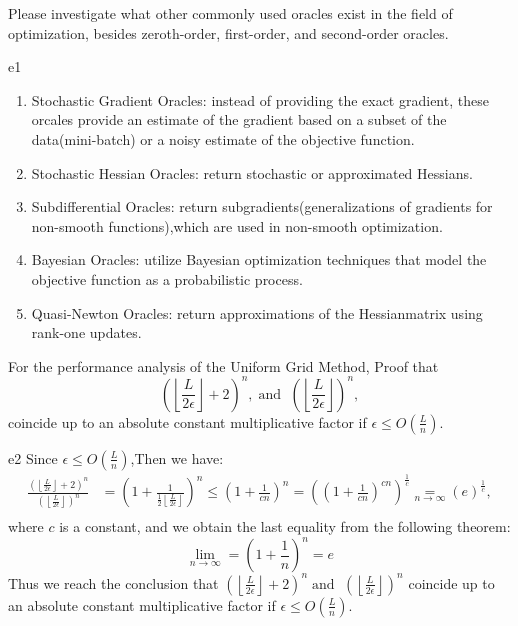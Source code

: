 \documentclass{article}
\begin{document}
\begin{excercise}\label{e1}
Please investigate what other commonly used oracles exist in the field of optimization, besides zeroth-order, first-order, and second-order oracles.
\end{excercise}
\begin{SOLUTION}{e1}
\begin{enumerate}
	\item Stochastic Gradient Oracles: instead of providing the exact gradient, these orcales provide an estimate of the gradient based on a subset of the data(mini-batch) or a noisy estimate of the objective function.
	\item Stochastic Hessian Oracles: return stochastic or approximated Hessians.
	\item Subdifferential Oracles: return subgradients(generalizations of gradients for non-smooth functions),which are used in non-smooth optimization.
	\item Bayesian Oracles: utilize Bayesian optimization techniques that model the objective function as a probabilistic process.
	\item Quasi-Newton Oracles: return approximations of the Hessianmatrix using rank-one updates.
\end{enumerate}
\end{SOLUTION}


\begin{excercise}\label{e2}
	For the performance analysis of the Uniform Grid Method, Proof that
	\begin{equation}
		\left( \left \lfloor \frac{L}{2\epsilon} \right \rfloor + 2 \right)^n,\; \textrm{and } \; \left( \left \lfloor \frac{L}{2\epsilon} \right \rfloor \right)^n,\nonumber
	\end{equation}
	coincide up to an absolute constant multiplicative factor if $\epsilon \leq O(\frac{L}{n})$.
\end{excercise}

\begin{PROOF}{e2}
	Since $\epsilon \le O(\frac{L}{n})$,Then we have:
	\begin{equation}
		\begin{split}
		\frac{\left( \left \lfloor \frac{L}{2\epsilon} \right \rfloor + 2 \right)^n}{\left( \left \lfloor \frac{L}{2\epsilon} \right \rfloor \right)^n} &= (1+\frac{1}{\frac{1}{2}\left \lfloor \frac{L}{2\epsilon} \right \rfloor})^n \le (1+\frac{1}{cn})^n=((1+\frac{1}{cn})^{cn})^{\frac{1}{c}}\mathop{=}\limits_{n\to \infty}(e)^{\frac{1}{c}},\\
		\end{split}
	\end{equation}
	where $c$ is a constant, and we obtain the last equality from the following theorem:
	\begin{equation}
		\mathop{lim}_{n\to\infty}=(1+\frac{1}{n})^n=e
	\end{equation}
	Thus we reach the conclusion that $\left( \left \lfloor \frac{L}{2\epsilon} \right \rfloor + 2 \right)^n\; \textrm{and } \; \left( \left \lfloor \frac{L}{2\epsilon} \right \rfloor \right)^n\nonumber$ coincide up to an absolute constant multiplicative factor if $\epsilon \le O(\frac{L}{n})$.
\end{PROOF}
\end{document}
